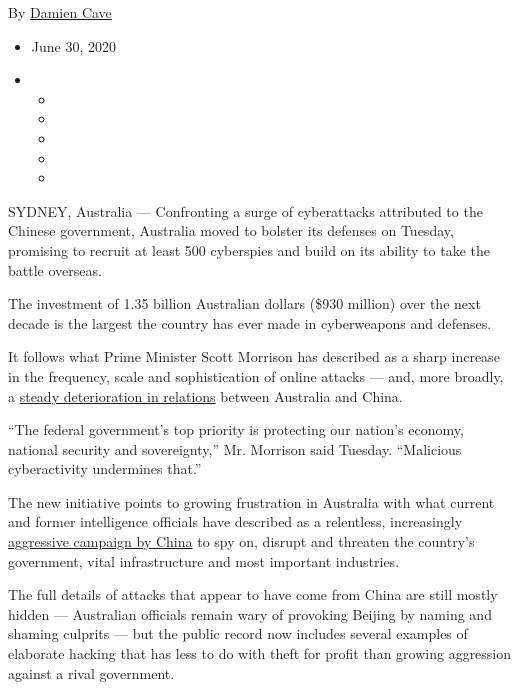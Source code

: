 By \href{https://www.nytimes3xbfgragh.onion/by/damien-cave}{Damien Cave}

\begin{itemize}
\item
  June 30, 2020
\item
  \begin{itemize}
  \item
  \item
  \item
  \item
  \item
  \end{itemize}
\end{itemize}

SYDNEY, Australia --- Confronting a surge of cyberattacks attributed to
the Chinese government, Australia moved to bolster its defenses on
Tuesday, promising to recruit at least 500 cyberspies and build on its
ability to take the battle overseas.

The investment of 1.35 billion Australian dollars (\$930 million) over
the next decade is the largest the country has ever made in cyberweapons
and defenses.

It follows what Prime Minister Scott Morrison has described as a sharp
increase in the frequency, scale and sophistication of online attacks
--- and, more broadly, a
\href{https://www.nytimes3xbfgragh.onion/2020/06/26/world/australia/politician-home-raid-china-influence.html}{steady
deterioration in relations} between Australia and China.

``The federal government's top priority is protecting our nation's
economy, national security and sovereignty,'' Mr. Morrison said Tuesday.
``Malicious cyberactivity undermines that.''

The new initiative points to growing frustration in Australia with what
current and former intelligence officials have described as a
relentless, increasingly
\href{https://www.nytimes3xbfgragh.onion/2019/05/20/world/australia/australia-china.html}{aggressive
campaign by China} to spy on, disrupt and threaten the country's
government, vital infrastructure and most important industries.

The full details of attacks that appear to have come from China are
still mostly hidden --- Australian officials remain wary of provoking
Beijing by naming and shaming culprits --- but the public record now
includes several examples of elaborate hacking that has less to do with
theft for profit than growing aggression against a rival government.

